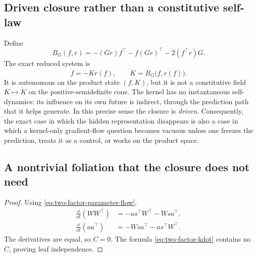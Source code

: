 \subsection{Driven closure rather than a constitutive self-law}

Define
\begin{equation}
  B_G(f,r)=-(Gr)f^\top-f(Gr)^\top-2(f^\top r)G.
  \label{eq:BG}
\end{equation}
The exact reduced system is
\begin{equation}
  \dot f=-Kr(f),
  \qquad
  \dot K=B_G\bigl(f,r(f)\bigr).
  \label{eq:joint-driven-system}
\end{equation}
It is autonomous on the product state $(f,K)$, but it is not a constitutive field $K\mapsto\dot K$ on the positive-semidefinite cone.  The kernel has no instantaneous self-dynamics: its influence on its own future is indirect, through the prediction path that it helps generate.  In this precise sense the closure is \emph{driven}.  Consequently, the exact case in which the hidden representation disappears is also a case in which a kernel-only gradient-flow question becomes vacuous unless one freezes the prediction, treats it as a control, or works on the product space.

\subsection{A nontrivial foliation that the closure does not need}


\begin{proof}
Using \eqref{eq:two-factor-parameter-flow},
\begin{align}
  \frac{\dd}{\dd t}(WW^\top)
  &=-a s^\top W^\top-Ws a^\top,\\
  \frac{\dd}{\dd t}(aa^\top)
  &=-Ws a^\top-a s^\top W^\top.
\end{align}
The derivatives are equal, so $\dot C=0$.  The formula \eqref{eq:two-factor-kdot} contains no $C$, proving leaf independence.
\end{proof}

